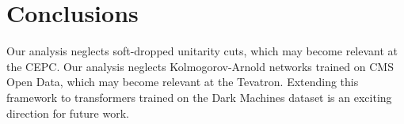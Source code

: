 \section{Conclusions}\label{sec:conclusions}

Our analysis neglects soft-dropped unitarity cuts, which may become
relevant at the CEPC. Our analysis neglects Kolmogorov-Arnold networks
trained on CMS Open Data, which may become relevant at the Tevatron.
Extending this framework to transformers trained on the Dark Machines
dataset is an exciting direction for future work.

